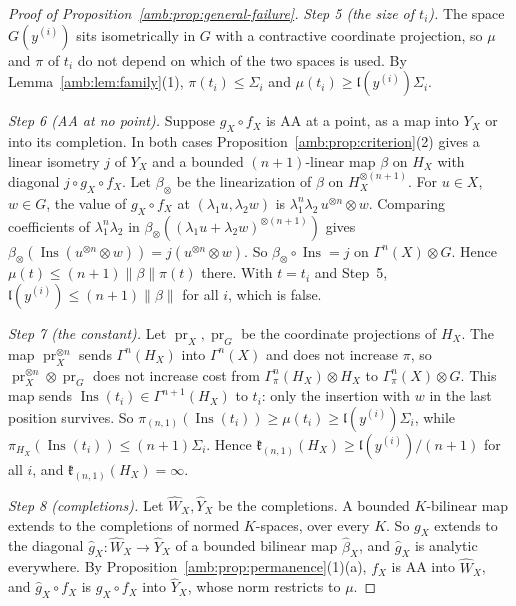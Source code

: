 \documentclass[11pt]{amsart}
\theoremstyle{definition}
\theoremstyle{remark}
\numberwithin{equation}{section}
\newcommand{\norm}[1]{\lVert #1\rVert}
\theoremstyle{plain}
\theoremstyle{definition}
\theoremstyle{plain}
\begin{document}
\begin{proof}[Proof of Proposition~\ref{amb:prop:general-failure}]
\emph{Step 5 (the size of $t_i$).} The space $G(y^{(i)})$ sits isometrically in $G$ with a contractive coordinate projection, so $\mu$ and $\pi$ of $t_i$ do not depend on which of the two spaces is used. By Lemma~\ref{amb:lem:family}(1), $\pi(t_i)\le\Sigma_i$ and $\mu(t_i)\ge\mathfrak l(y^{(i)})\Sigma_i$.

\emph{Step 6 (AA at no point).} Suppose $g_X\circ f_X$ is AA at a point, as a map into $Y_X$ or into its completion. In both cases Proposition~\ref{amb:prop:criterion}(2) gives a linear isometry $j$ of $Y_X$ and a bounded $(n+1)$-linear map $\beta$ on $H_X$ with diagonal $j\circ g_X\circ f_X$. Let $\beta_\otimes$ be the linearization of $\beta$ on $H_X^{\otimes(n+1)}$. For $u\in X$, $w\in G$, the value of $g_X\circ f_X$ at $(\lambda_1u,\lambda_2w)$ is $\lambda_1^n\lambda_2\,u^{\otimes n}\otimes w$. Comparing coefficients of $\lambda_1^n\lambda_2$ in $\beta_\otimes((\lambda_1u+\lambda_2w)^{\otimes(n+1)})$ gives $\beta_\otimes(\operatorname{Ins}(u^{\otimes n}\otimes w))=j(u^{\otimes n}\otimes w)$. So $\beta_\otimes\circ\operatorname{Ins}=j$ on $\Gamma^n(X)\otimes G$. Hence $\mu(t)\le(n+1)\norm\beta\pi(t)$ there. With $t=t_i$ and Step~5, $\mathfrak l(y^{(i)})\le(n+1)\norm\beta$ for all $i$, which is false.

\emph{Step 7 (the constant).} Let $\operatorname{pr}_X,\operatorname{pr}_G$ be the coordinate projections of $H_X$. The map $\operatorname{pr}_X^{\otimes n}$ sends $\Gamma^n(H_X)$ into $\Gamma^n(X)$ and does not increase $\pi$, so $\operatorname{pr}_X^{\otimes n}\otimes\operatorname{pr}_G$ does not increase cost from $\Gamma^n_\pi(H_X)\otimes H_X$ to $\Gamma^n_\pi(X)\otimes G$. This map sends $\operatorname{Ins}(t_i)\in\Gamma^{n+1}(H_X)$ to $t_i$: only the insertion with $w$ in the last position survives. So $\pi_{(n,1)}(\operatorname{Ins}(t_i))\ge\mu(t_i)\ge\mathfrak l(y^{(i)})\Sigma_i$, while $\pi_{H_X}(\operatorname{Ins}(t_i))\le(n+1)\Sigma_i$. Hence $\mathfrak k_{(n,1)}(H_X)\ge\mathfrak l(y^{(i)})/(n+1)$ for all $i$, and $\mathfrak k_{(n,1)}(H_X)=\infty$.

\emph{Step 8 (completions).} Let $\widehat W_X,\widehat Y_X$ be the completions. A bounded $K$\nobreakdash-bilinear map extends to the completions of normed $K$\nobreakdash-spaces, over every $K$. So $g_X$ extends to the diagonal $\hat g_X\colon\widehat W_X\to\widehat Y_X$ of a bounded bilinear map $\hat\beta_X$, and $\hat g_X$ is analytic everywhere. By Proposition~\ref{amb:prop:permanence}(1)(a), $f_X$ is AA into $\widehat W_X$, and $\hat g_X\circ f_X$ is $g_X\circ f_X$ into $\widehat Y_X$, whose norm restricts to $\mu$.
\end{proof}
\end{document}
